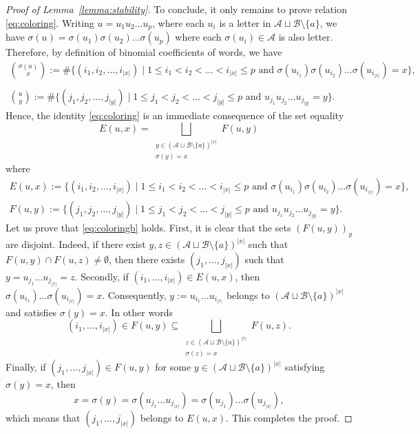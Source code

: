 \documentclass[10pt,a4paper]{amsart}
\newcommand{\A}{\mathcal{A}}
\newcommand{\B}{\mathcal{B}}
\newcommand{\ds}{\displaystyle}
\begin{document}
\begin{proof}[Proof of Lemma~\ref{lemma:stability}]
\medskip

To conclude, it only remains to prove relation \eqref{eq:coloring}. Writing $u=u_1u_2\ldots u_p$, where each $u_i$ is a letter in $\A\sqcup\B\setminus\{a\}$, we have $\sigma(u)=\sigma(u_1)\sigma(u_2)\ldots\sigma(u_p)$ where each $\sigma(u_i)\in\A$ is also letter. Therefore, by definition of binomial coefficients of words, we have
\[
    \begin{array}{c}
        \ds\binom{\sigma(u)}{x}:=\#\big\{(i_1,i_2,\ldots,i_{|x|}) \;\big |\; 1\leq i_1<i_2<\ldots<i_{|x|}\leq p \text{ and } \sigma(u_{i_1})\sigma(u_{i_2})\ldots\sigma(u_{i_{|x|}})=x\big\},\\
        \\
        \ds\binom{u}{y}:=\#\big\{(j_1,j_2,\ldots,j_{|y|}) \;\big |\; 1\leq j_1<j_2<\ldots<j_{|y|}\leq p \text{ and } u_{j_1}u_{j_2}\ldots u_{j_{|y|}}=y\big\}.
    \end{array}
\]
Hence, the identity \eqref{eq:coloring} is an immediate consequence of the set equality
\begin{equation}\label{eq:coloringb}
    E(u,x)=\bigsqcup\limits_{\substack{y\in(\A\sqcup\B\setminus\{a\})^{|x|} \\ \sigma(y)=x}} F(u,y)
\end{equation}
where
\[
    \begin{array}{l}
        E(u,x):=\big\{(i_1,i_2,\ldots,i_{|x|}) \;\big |\; 1\leq i_1<i_2<\ldots<i_{|x|}\leq p \text{ and } \sigma(u_{i_1})\sigma(u_{i_2})\ldots\sigma(u_{i_{|x|}})=x\big\},\\
        F(u,y):=\big\{(j_1,j_2,\ldots,j_{|y|}) \;\big |\; 1\leq j_1<j_2<\ldots<j_{|y|}\leq p \text{ and } u_{j_1}u_{j_2}\ldots u_{j_{|y|}}=y\big\}.
    \end{array}
\]
Let us prove that \eqref{eq:coloringb} holds. First, it is clear that the sets $(F(u,y))_y$ are disjoint. Indeed, if there exist $y,z\in (\A\sqcup\B\setminus\{a\})^{|x|}$ such that $F(u,y)\cap F(u,z)\neq\emptyset$, then there exists $(j_1,\ldots,j_{|x|})$ such that $y=u_{j_1}\ldots u_{j_{|x|}}=z$. Secondly, if $(i_1,\ldots,i_{|x|})\in E(u,x)$, then $\sigma(u_{i_1})\ldots\sigma(u_{i_{|x|}})=x$. Consequently, $y:=u_{i_1}\ldots u_{i_{|x|}}$ belongs to $(\A\sqcup\B\setminus\{a\})^{|x|}$ and satisfies $\sigma(y)=x$. In other words
\[
    (i_1,\ldots,i_{|x|})\in F(u,y)\subseteq \bigsqcup\limits_{\substack{z\in(\A\sqcup\B\setminus\{a\})^{|x|} \\ \sigma(z)=x}} F(u,z).
\]
Finally, if $(j_1,\ldots,j_{|x|})\in F(u,y)$ for some $y\in(\A\sqcup\B\setminus\{a\})^{|x|}$ satisfying $\sigma(y)=x$, then
\[
    x=\sigma(y)=\sigma(u_{j_1}\ldots u_{j_{|x|}})=\sigma(u_{j_1})\ldots\sigma(u_{j_{|x|}}),
\]
which means that $(j_1,\ldots,j_{|x|})$ belongs to $E(u,x)$. This completes the proof.
\end{proof}
\end{document}
